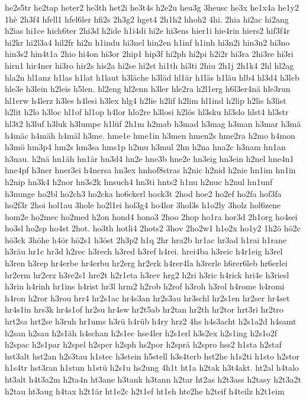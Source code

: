 {he2s5tr
he2tap
heter2
he3th
het2i
he3t4s
h2e2u
heu3g
3heusc
he3x
he1x4a
he1y2
1hè
2h3f4
hfell1
hfel6ler
hfi2s
2h3g2
hget4
2h1h2
hhoh2
4hi.
2hia
hi2ac
hi2ang
h2ias
hi1ce
hich6ter
2hi3d
h2ide
h1i4di
hi2e
hi3ens
hier1i
hie4rin
hiers2
hif3f4r
hi2kr
hi2l3a4
hil2fr
hi2n
h1indu
hi3nel
hin2en
h1inf
h1inh
hi3n2i
hin3n2
hi3no
hin3s2
hin4t1a
2hio
hi4on
hi3or
2hip1
hip3f
hi2ph
hi2pi
h2i2r
hi3ra
2hi3re
hi3ri
hirn1
hir4ner
hi3ro
hir2s
his2a
hi2se
hi2st
hi1th
hi3ti
2hiu
2h1j
2h1k4
2hl
hl2ag
hla2n
hl1anz
h1las
h1lat
h1laut
h3läche
h3läd
hl1är
h1läs
h1läu
hlb4
hl3d4
h3leb
hle3e
h3lein
h2leis
h5len.
hl2eng
hl2enn
h3ler
hle2ra
h2l1erg
h6l3er4nä
hle3run
hl1erw
h4lerz
h3les
h4lesi
h3lex
hlg4
h2lie
h2lif
h2lim
hl1ind
h2lip
h2lis
h3list
h2lit
h2lo
h3loc
hl1of
hl1op
h4lor
hlo2re
h3losi
h2lös
hl3sku
hl3slo
hlst4
hl3str
hl3t2
h3luf
h3luk
h3lumpe
h1lüf
2h1m
h2mab
h3mad
h3mag
h3man
h3mar
h3mä
h4mäc
h4mäh
h4mäl
h3me.
hme1e
hme1in
h3men
hmen2s
hme2ra
h2mo
h4mon
h3mö
hm3p4
hm2s
hm3sa
hms1p
h2mu
h3mul
2hn
h2na
hna2c
h3nam
hn1an
h3nau.
h2nä
hn1äh
hn1är
hn3d4
hn2e
hne3b
hne2e
hn3eig
hn3ein
h2nel
hne4n1
hne4pf
h3ner
hner3ei
h4nersa
hn3ex
hnhof8stras
h2nic
h2nid
h2nie
hn1im
hn1in
h2nip
hn3k4
h2nor
hn3s2k
hnsuch4
hn3ti
hnts2
h1nu
h2nuc
h2nul
hn1unf
h3nunge
ho2bl
ho2ch3
ho2cka
ho6ckerl
hock3t
2hod
hoe2
ho2ef
ho2fa
hof3fa
ho2f3r
2hoi
hol1au
3hole
ho2l1ei
hol3g4
ho4lor
3hol3s
h1o2ly
3holz
hol6zene
hom2e
ho2mec
ho2med
h2on
hond4
hono3
2hoo
2hop
ho1ra
hor3d
2h1org
ho4sei
ho3sl
ho2sp
ho4st
2hot.
ho3th
hotli4
2hots2
3hov
2ho2w1
h1o2x
ho1y2
1h2ö
hö2c
hö3ck
3höhe
h4ör
hö2s1
h3öst
2h3p2
h1q
2hr
hra2b
hr1ac
hr3ad
h1rai
h1rane
h3räu
hr1c
hr3d
h2rec
h3rech
h3red
h3ref
h4rei.
hrei4ba
h3reic
h4r1eig
h3rel
h3ren
h3rep
hr4erbe
hr4erbu
hr2erg
hr2erk
h4rer4la
h3rerle
h6rer6leb
hr6erlei
hr2erm
hr2erz
h3re2s1
hre2t
h2r1eta
h3rev
hrg2
h2ri
h3ric
h4rick
hri4e
h3riesl
h3rin
h4rinh
hr1ins
h4rist
hr3l
hrm2
h2rob
h2rof
h3roh
h3rol
h4rome
h4romi
h4ron
h2ror
h3rou
hrr4
hr2s1ac
hr4s3an
hr2s3au
hr3schl
hr2s1en
hr2ser
hr4set
hr4s1in
hrs3k
hr4s1of
hr2su
hr4sw
hr2t5ab
hr2tan
hr2th
hr2tor
hrt3ri
hr2tro
hrt2sa
hrt2se
h3ruh
hr1ums
h3rü
h4rüb
h4ry
hrz2
4hs
h4s3acht
h2s1a2d
h4samt
h2san
h2sau
h2s1äh
h4schan
h2s1ec
hse4ler
h2s1erl
h3s2ex
h2s1ing
h2s1o2f
h2spac
h2s1par
h2spel
h2sper
h2sph
hs2por
h2sprä
h2spro
hss2
h1sta
h2staf
hst3alt
hst2an
h2s3tau
h1stec
h3stein
h5stell
h3s4terb
hst2he
h1s2ti
h1sto
h2stor
h1s4tr
hst3ran
h1stun
h1stü
h2s1u
hs2ung
4h1t
ht1a
h2tak
h3t4akt.
ht2al
h4talo
ht3alt
h4t3a2m
h2ta4n
ht3ane
h3tank
h3tann
h2tar
ht2as
h2t3ass
h2tasy
h2t3a2t
h2tau
ht3aug
h4tax
h2t1är
ht1e2c
h2t1ef
ht1eh
hte2he
h2teif
h4teilz
h2t1eim
}
